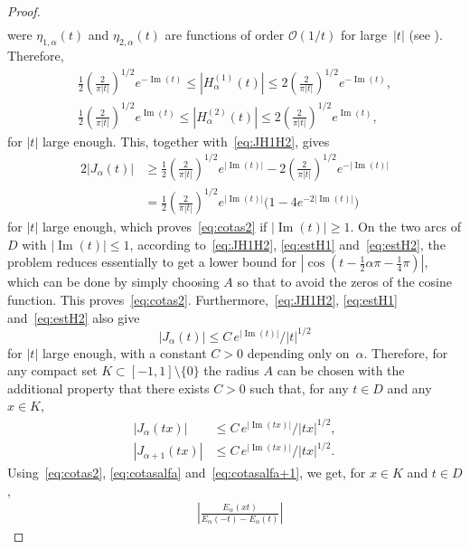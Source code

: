 \documentclass[a4paper]{amsart}
\newcommand{\Ea}{E_{\alpha}}
\newcommand{\calO}{\mathcal{O}}
\renewcommand{\Im}{\operatorname{Im}}
\theoremstyle{plain}
\theoremstyle{definition}
\theoremstyle{remark}
\numberwithin{equation}{section}
\begin{document}
\begin{proof}
\begin{align}
\end{align}
were $\eta_{1,\alpha}(t)$ and $\eta_{2,\alpha}(t)$ are functions of order $\calO(1/t)$ for large~$|t|$ (see \cite[\S\,15.4, p.~496]{Wat}). Therefore,
\begin{gather*}
   \frac{1}{2} \left(\frac{2}{\pi |t|}\right)^{1/2} e^{-\Im(t)}
   \leq \left|H_{\alpha}^{(1)}(t)\right|
   \leq 2 \left(\frac{2}{\pi |t|}\right)^{1/2} e^{-\Im(t)},
\\
   \frac{1}{2} \left(\frac{2}{\pi |t|}\right)^{1/2} e^{\Im(t)}
   \leq \left|H_{\alpha}^{(2)}(t)\right|
   \leq 2 \left(\frac{2}{\pi |t|}\right)^{1/2} e^{\Im(t)},
\end{gather*}
for $|t|$ large enough. This, together with~\eqref{eq:JH1H2}, gives
\begin{align*}
   2 |J_\alpha(t)|
   &\geq \frac{1}{2} \left(\frac{2}{\pi |t|}\right)^{1/2} e^{|\Im(t)|}
   - 2 \left(\frac{2}{\pi |t|}\right)^{1/2} e^{-|\Im(t)|}
   \\
   &= \frac{1}{2} \left(\frac{2}{\pi |t|}\right)^{1/2} e^{|\Im(t)|}
   \Big(1 - 4 e^{-2|\Im(t)|}\Big)
\end{align*}
for $|t|$ large enough, which proves~\eqref{eq:cotas2} if $|\Im(t)| \geq 1$. On the two arcs of $D$ with $|\Im(t)| \leq 1$, according to~\eqref{eq:JH1H2}, \eqref{eq:estH1} and~\eqref{eq:estH2}, the problem reduces essentially to get a lower bound for $|\cos(t-\frac{1}{2}\alpha\pi - \frac{1}{4}\pi)|$, which can be done by simply choosing $A$ so that to avoid the zeros of the cosine function. This proves~\eqref{eq:cotas2}.
Furthermore,~\eqref{eq:JH1H2}, \eqref{eq:estH1} and~\eqref{eq:estH2} also give 
\begin{equation*}
   |J_{\alpha} (t)| \leq C \, {e^{|\Im(t)|}}/{|t|^{1/2}}
\end{equation*}
for $|t|$ large enough, with a constant $C > 0$ depending only on~$\alpha$. Therefore, for any compact set $K\subset [-1,1]\setminus\{0\}$ the radius $A$ can be chosen with the additional property that there exists $C > 0$ such that, for any $t \in D$ and any $x \in K$,
\begin{align}
\label{eq:cotasalfa}
   |J_{\alpha} (tx)| &\leq C\, {e^{|\Im(tx)|}}/{|tx|^{1/2}},
   \\
\label{eq:cotasalfa+1}
   |J_{\alpha+1} (tx)| &\leq C\, {e^{|\Im(tx)|}}/{|tx|^{1/2}}.
\end{align}
Using~\eqref{eq:cotas2}, \eqref{eq:cotasalfa} and~\eqref{eq:cotasalfa+1}, we get, for $x\in K$ and $t\in D$,
\begin{align*}
&\left| \frac{\Ea(xt)}{\Ea(-t)-\Ea(t)}\right| 

\end{align*}
\end{proof}
\end{document}
